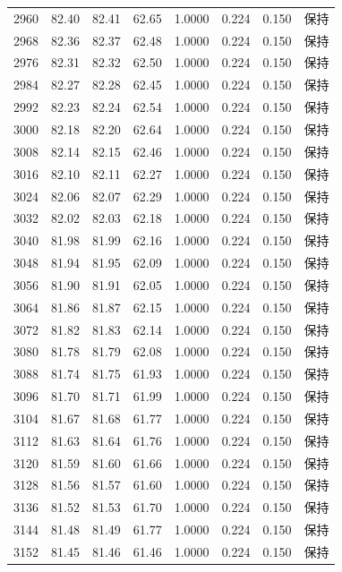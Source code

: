 \begin{longtable}{rrrrrrrr}
2960 & 82.40 & 82.41 & 62.65 & 1.0000 & 0.224 & 0.150 & 保持 \\
2968 & 82.36 & 82.37 & 62.48 & 1.0000 & 0.224 & 0.150 & 保持 \\
2976 & 82.31 & 82.32 & 62.50 & 1.0000 & 0.224 & 0.150 & 保持 \\
2984 & 82.27 & 82.28 & 62.45 & 1.0000 & 0.224 & 0.150 & 保持 \\
2992 & 82.23 & 82.24 & 62.54 & 1.0000 & 0.224 & 0.150 & 保持 \\
3000 & 82.18 & 82.20 & 62.64 & 1.0000 & 0.224 & 0.150 & 保持 \\
3008 & 82.14 & 82.15 & 62.46 & 1.0000 & 0.224 & 0.150 & 保持 \\
3016 & 82.10 & 82.11 & 62.27 & 1.0000 & 0.224 & 0.150 & 保持 \\
3024 & 82.06 & 82.07 & 62.29 & 1.0000 & 0.224 & 0.150 & 保持 \\
3032 & 82.02 & 82.03 & 62.18 & 1.0000 & 0.224 & 0.150 & 保持 \\
3040 & 81.98 & 81.99 & 62.16 & 1.0000 & 0.224 & 0.150 & 保持 \\
3048 & 81.94 & 81.95 & 62.09 & 1.0000 & 0.224 & 0.150 & 保持 \\
3056 & 81.90 & 81.91 & 62.05 & 1.0000 & 0.224 & 0.150 & 保持 \\
3064 & 81.86 & 81.87 & 62.15 & 1.0000 & 0.224 & 0.150 & 保持 \\
3072 & 81.82 & 81.83 & 62.14 & 1.0000 & 0.224 & 0.150 & 保持 \\
3080 & 81.78 & 81.79 & 62.08 & 1.0000 & 0.224 & 0.150 & 保持 \\
3088 & 81.74 & 81.75 & 61.93 & 1.0000 & 0.224 & 0.150 & 保持 \\
3096 & 81.70 & 81.71 & 61.99 & 1.0000 & 0.224 & 0.150 & 保持 \\
3104 & 81.67 & 81.68 & 61.77 & 1.0000 & 0.224 & 0.150 & 保持 \\
3112 & 81.63 & 81.64 & 61.76 & 1.0000 & 0.224 & 0.150 & 保持 \\
3120 & 81.59 & 81.60 & 61.66 & 1.0000 & 0.224 & 0.150 & 保持 \\
3128 & 81.56 & 81.57 & 61.60 & 1.0000 & 0.224 & 0.150 & 保持 \\
3136 & 81.52 & 81.53 & 61.70 & 1.0000 & 0.224 & 0.150 & 保持 \\
3144 & 81.48 & 81.49 & 61.77 & 1.0000 & 0.224 & 0.150 & 保持 \\
3152 & 81.45 & 81.46 & 61.46 & 1.0000 & 0.224 & 0.150 & 保持 \\

\end{longtable}
